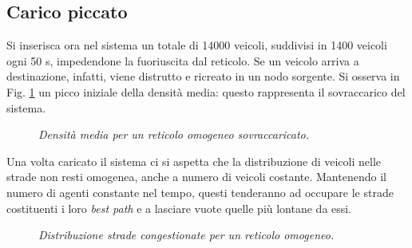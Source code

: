 \documentclass[../main.tex]{subfiles}
\begin{document}
\subsection{Carico piccato}
Si inserisca ora nel sistema un totale di 14000 veicoli, suddivisi in 1400 veicoli ogni 50 s, impedendone la fuoriuscita dal reticolo.
Se un veicolo arriva a destinazione, infatti, viene distrutto e ricreato in un nodo sorgente.
Si osserva in Fig. \ref{fig:density_peaked_homo} un picco iniziale della densit\`a media: questo rappresenta il sovraccarico del sistema.
\begin{figure}[H]
    \centering
    \caption[Densit\`a media per un reticolo omogeneo sovraccaricato]{\emph{Densit\`a media per un reticolo omogeneo sovraccaricato.}}
    \label{fig:density_peaked_homo}
\end{figure}
Una volta caricato il sistema ci si aspetta che la distribuzione di veicoli nelle strade non resti omogenea, anche a numero di veicoli costante.
Mantenendo il numero di agenti constante nel tempo, questi tenderanno ad occupare le strade costituenti i loro \emph{best path} e a lasciare vuote quelle pi\`u lontane da essi.
\begin{figure}[H]
    \centering
    \caption[Distribuzione strade non congestionate per un reticolo omogeneo.]{\emph{Distribuzione strade congestionate per un reticolo omogeneo.}}
    \label{fig:nStreet_density_peaked_homo}
\end{figure}
\end{document}
